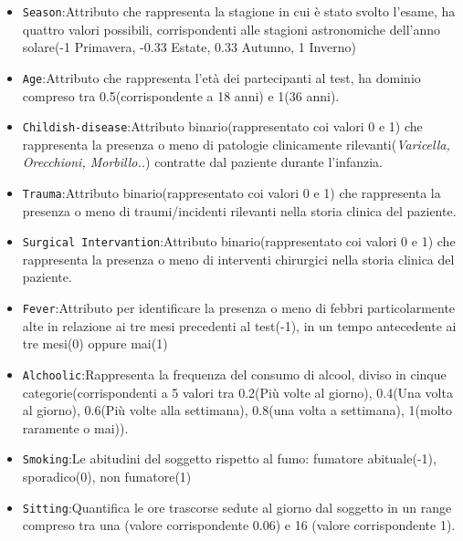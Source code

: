   \begin{itemize}
  	\item \texttt{Season}:Attributo che rappresenta la stagione in cui è stato svolto l'esame, ha quattro valori possibili, corrispondenti alle stagioni astronomiche dell'anno solare(-1 Primavera, -0.33 Estate, 0.33 Autunno, 1 Inverno)
  	
  	\item \texttt{Age}:Attributo che rappresenta l'età dei partecipanti al test, ha dominio compreso tra 0.5(corrispondente a 18 anni) e 1(36 anni).
  	
  	\item \texttt{Childish-disease}:Attributo binario(rappresentato coi valori 0 e 1) che rappresenta la presenza o meno di patologie clinicamente rilevanti(\textit{Varicella, Orecchioni, Morbillo..}) contratte dal paziente durante l'infanzia.
  
  	\item \texttt{Trauma}:Attributo binario(rappresentato coi valori 0 e 1) che rappresenta la presenza o meno di traumi/incidenti rilevanti nella storia clinica del paziente.	
  	
  	\item \texttt{Surgical Intervantion}:Attributo binario(rappresentato coi valori 0 e 1) che rappresenta la presenza o meno di interventi chirurgici nella storia clinica del paziente.
  	
  	\item \texttt{Fever}:Attributo per identificare la presenza o meno di febbri particolarmente alte in relazione ai tre mesi precedenti al test(-1), in un tempo antecedente ai tre mesi(0) oppure mai(1)
  	
  	\item \texttt{Alchoolic}:Rappresenta la frequenza del consumo di alcool, diviso in cinque categorie(corrispondenti a 5 valori tra 0.2(Più volte al giorno), 0.4(Una volta al giorno), 0.6(Più volte alla settimana), 0.8(una volta a settimana), 1(molto raramente o mai)).
  	
  	\item \texttt{Smoking}:Le abitudini del soggetto rispetto al fumo: fumatore abituale(-1), sporadico(0), non fumatore(1)
  	
  	\item \texttt{Sitting}:Quantifica le ore trascorse sedute al giorno dal soggetto in un range compreso tra una (valore corrispondente 0.06) e 16 (valore corrispondente 1).
  	
  \end{itemize} 

